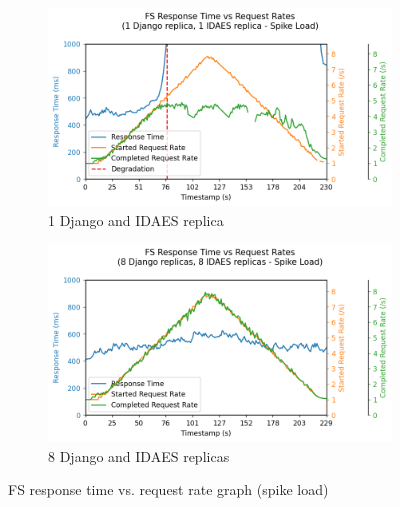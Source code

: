 \begin{figure}[h]
    \centering
    \begin{subfigure}{.5\textwidth}
      \centering
      \includegraphics[width=\linewidth]{figures/fs-replica-count-i1-response-graph-spike.png}
      \caption{1 Django and IDAES replica}
    \end{subfigure}%
    \begin{subfigure}{.5\textwidth}
      \centering
      \includegraphics[width=\linewidth]{figures/fs-replica-count-i4-response-graph-spike.png}
      \caption{8 Django and IDAES replicas}
    \end{subfigure}

    \caption{FS response time vs. request rate graph (spike load)}
    \label{figure:fs-replica-count-graph}
\end{figure}


